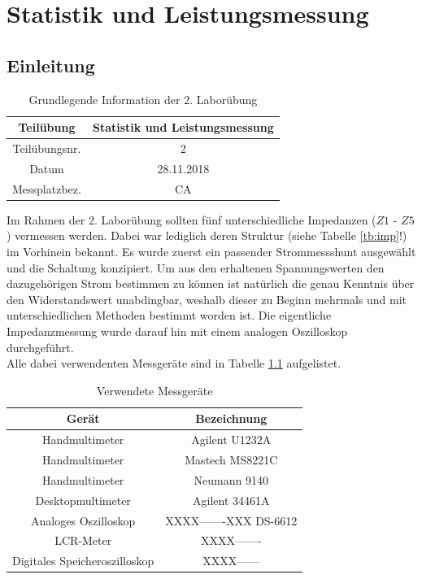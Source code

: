 \chapter{Statistik und Leistungsmessung}
\section{Einleitung}
\begin{table}[h]
	\centering
	\begin{tabular}{|c|c|}
		\hline 
		Teilübung 	& Statistik und Leistungsmessung \\
		\hline 
		Teilübungsnr. 		& 2	 \\ 
		\hline 
		Datum 		& 28.11.2018 \\ 
		\hline 
		Messplatzbez. 	& CA \\
		\hline
	\end{tabular} 
	\caption{Grundlegende Information der 2. Laborübung}
\end{table}
\noindent
Im Rahmen der 2. Laborübung sollten fünf unterschiedliche Impedanzen ($Z1$ - $Z5$) vermessen werden. Dabei war lediglich deren Struktur (siehe Tabelle \ref{tb:imp}!) im Vorhinein bekannt. Es wurde zuerst ein passender Strommessshunt ausgewählt und die Schaltung konzipiert. Um aus den erhaltenen Spannungswerten den dazugehörigen Strom bestimmen zu können ist natürlich die genau Kenntnis über den Widerstandswert unabdingbar, weshalb dieser zu Beginn mehrmals und mit unterschiedlichen Methoden bestimmt worden ist. Die eigentliche Impedanzmessung wurde darauf hin mit einem analogen Oszilloskop durchgeführt. \\
Alle dabei verwendenten Messgeräte sind in Tabelle \ref{tb:messgeraete} aufgelistet.
\begin{table}[h]
	\begin{tabular}{|c|c|}
	\hline 
	Gerät & Bezeichnung \\ 
	\hline 
	Handmultimeter & Agilent U1232A \\ 
	\hline 
	Handmultimeter & Mastech MS8221C \\ 
	\hline 
	Handmultimeter & Neumann 9140 \\ 
	\hline 
	Desktopmultimeter & Agilent 34461A \\ 
	\hline 
	Analoges Oszilloskop & XXXX-------XXX DS-6612 \\ 
	\hline 
	LCR-Meter & XXXX------- \\ 
	\hline 
	Digitales Speicheroszilloskop & XXXX------\\ 
	\hline 
	\end{tabular} 
	\centering
	\caption{Verwendete Messgeräte}
	\label{tb:messgeraete}
\end{table}

